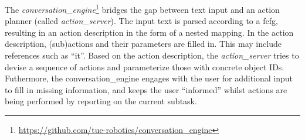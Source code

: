 \label{ssec:conversation}
\noindent The \emph{conversation\_engine}\footnote{\url{https://github.com/tue-robotics/conversation_engine}} bridges the gap between text input and an action planner (called \emph{action\_server}). The input text is parsed according to a \acrshort{fcfg}, resulting in an action description in the form of a nested mapping. In the action description, (sub)actions and their parameters are filled in.
This may include references such as “it”.
Based on the action description, the \emph{action\_server} tries to devise a sequence of actions and parameterize those with concrete object IDs.
Futhermore, the conversation\_engine engages with the user for additional input to fill in missing information, and keeps the user “informed” whilst actions are being performed by reporting on the current subtask.

